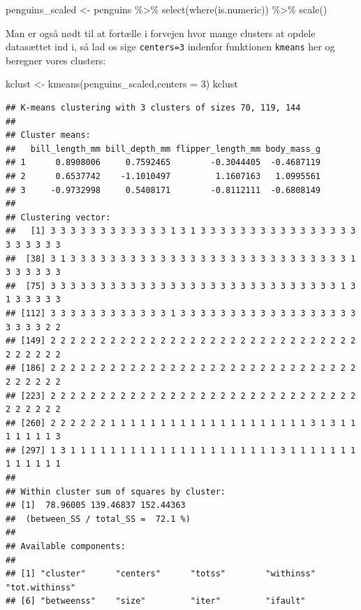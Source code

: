 \documentclass[
]{book}
\newenvironment{Shaded}{\begin{snugshade}}{\end{snugshade}}
\newcommand{\AttributeTok}[1]{\textcolor[rgb]{0.77,0.63,0.00}{#1}}
\newcommand{\DecValTok}[1]{\textcolor[rgb]{0.00,0.00,0.81}{#1}}
\newcommand{\FunctionTok}[1]{\textcolor[rgb]{0.00,0.00,0.00}{#1}}
\newcommand{\NormalTok}[1]{#1}
\newcommand{\OtherTok}[1]{\textcolor[rgb]{0.56,0.35,0.01}{#1}}
\newcommand{\SpecialCharTok}[1]{\textcolor[rgb]{0.00,0.00,0.00}{#1}}
\begin{document}
\begin{Shaded}
\begin{Highlighting}[]
\NormalTok{penguins\_scaled }\OtherTok{\textless{}{-}}\NormalTok{ penguins }\SpecialCharTok{\%\textgreater{}\%} 
  \FunctionTok{select}\NormalTok{(}\FunctionTok{where}\NormalTok{(is.numeric)) }\SpecialCharTok{\%\textgreater{}\%} 
  \FunctionTok{scale}\NormalTok{()}
\end{Highlighting}
\end{Shaded}

Man er også nødt til at fortælle i forvejen hvor mange clusters at opdele datasættet ind i, så lad os sige \texttt{centers=3} indenfor funktionen \texttt{kmeans} her og beregner vores clusters:

\begin{Shaded}
\begin{Highlighting}[]
\NormalTok{kclust }\OtherTok{\textless{}{-}} \FunctionTok{kmeans}\NormalTok{(penguins\_scaled,}\AttributeTok{centers =} \DecValTok{3}\NormalTok{)}
\NormalTok{kclust}
\end{Highlighting}
\end{Shaded}

\begin{verbatim}
## K-means clustering with 3 clusters of sizes 70, 119, 144
## 
## Cluster means:
##   bill_length_mm bill_depth_mm flipper_length_mm body_mass_g
## 1      0.8908006     0.7592465        -0.3044405  -0.4687119
## 2      0.6537742    -1.1010497         1.1607163   1.0995561
## 3     -0.9732998     0.5408171        -0.8112111  -0.6808149
## 
## Clustering vector:
##   [1] 3 3 3 3 3 3 3 3 3 3 3 3 1 3 1 3 3 3 3 3 3 3 3 3 3 3 3 3 3 3 3 3 3 3 3 3 3
##  [38] 3 1 3 3 3 3 3 3 3 3 3 3 3 3 3 3 3 3 3 3 3 3 3 3 3 3 3 3 3 3 1 3 3 3 3 3 3
##  [75] 3 3 3 3 3 3 3 3 3 3 3 3 3 3 3 3 3 3 3 3 3 3 3 3 3 3 3 3 3 1 3 1 3 3 3 3 3
## [112] 3 3 3 3 3 3 3 3 3 3 3 3 1 3 3 3 3 3 3 3 3 3 3 3 3 3 3 3 3 3 3 3 3 3 3 2 2
## [149] 2 2 2 2 2 2 2 2 2 2 2 2 2 2 2 2 2 2 2 2 2 2 2 2 2 2 2 2 2 2 2 2 2 2 2 2 2
## [186] 2 2 2 2 2 2 2 2 2 2 2 2 2 2 2 2 2 2 2 2 2 2 2 2 2 2 2 2 2 2 2 2 2 2 2 2 2
## [223] 2 2 2 2 2 2 2 2 2 2 2 2 2 2 2 2 2 2 2 2 2 2 2 2 2 2 2 2 2 2 2 2 2 2 2 2 2
## [260] 2 2 2 2 2 2 1 1 1 1 1 1 1 1 1 1 1 1 1 1 1 1 1 1 1 1 3 1 3 1 1 1 1 1 1 1 3
## [297] 1 3 1 1 1 1 1 1 1 1 1 1 1 1 1 1 1 1 1 1 1 1 1 3 1 1 1 1 1 1 1 1 1 1 1 1 1
## 
## Within cluster sum of squares by cluster:
## [1]  78.96005 139.46837 152.44363
##  (between_SS / total_SS =  72.1 %)
## 
## Available components:
## 
## [1] "cluster"      "centers"      "totss"        "withinss"     "tot.withinss"
## [6] "betweenss"    "size"         "iter"         "ifault"
\end{verbatim}
\end{document}
